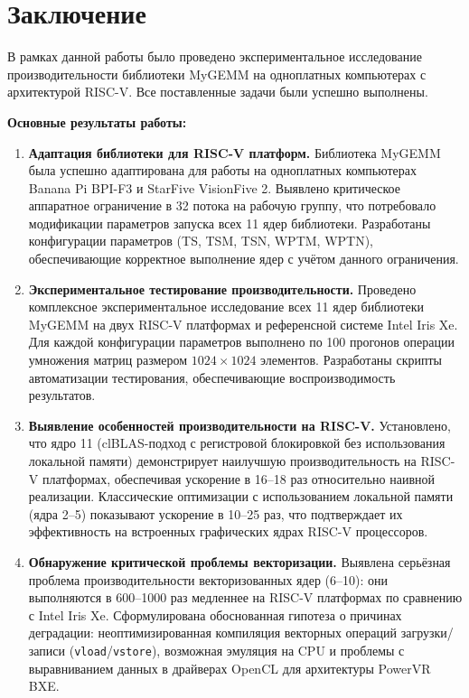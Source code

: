 
\section*{Заключение}

В рамках данной работы было проведено экспериментальное исследование производительности библиотеки MyGEMM на одноплатных компьютерах с архитектурой RISC-V. Все поставленные задачи были успешно выполнены.

\textbf{Основные результаты работы:}

\begin{enumerate}
    \item \textbf{Адаптация библиотеки для RISC-V платформ.} Библиотека MyGEMM была успешно адаптирована для работы на одноплатных компьютерах Banana Pi BPI-F3 и StarFive VisionFive 2. Выявлено критическое аппаратное ограничение в 32 потока на рабочую группу, что потребовало модификации параметров запуска всех 11 ядер библиотеки. Разработаны конфигурации параметров (TS, TSM, TSN, WPTM, WPTN), обеспечивающие корректное выполнение ядер с учётом данного ограничения.
    
    \item \textbf{Экспериментальное тестирование производительности.} Проведено комплексное экспериментальное исследование всех 11 ядер библиотеки MyGEMM на двух RISC-V платформах и референсной системе Intel Iris Xe. Для каждой конфигурации параметров выполнено по 100 прогонов операции умножения матриц размером $1024 \times 1024$ элементов. Разработаны скрипты автоматизации тестирования, обеспечивающие воспроизводимость результатов.
    
    \item \textbf{Выявление особенностей производительности на RISC-V.} Установлено, что ядро 11 (clBLAS-подход с регистровой блокировкой без использования локальной памяти) демонстрирует наилучшую производительность на RISC-V платформах, обеспечивая ускорение в 16--18 раз относительно наивной реализации. Классические оптимизации с использованием локальной памяти (ядра 2--5) показывают ускорение в 10--25 раз, что подтверждает их эффективность на встроенных графических ядрах RISC-V процессоров.
    
    \item \textbf{Обнаружение критической проблемы векторизации.} Выявлена серьёзная проблема производительности векторизованных ядер (6--10): они выполняются в 600--1000 раз медленнее на RISC-V платформах по сравнению с Intel Iris Xe. Сформулирована обоснованная гипотеза о причинах деградации: неоптимизированная компиляция векторных операций загрузки/записи (\texttt{vload}/\texttt{vstore}), возможная эмуляция на CPU и проблемы с выравниванием данных в драйверах OpenCL для архитектуры PowerVR BXE.
    

\end{enumerate}
